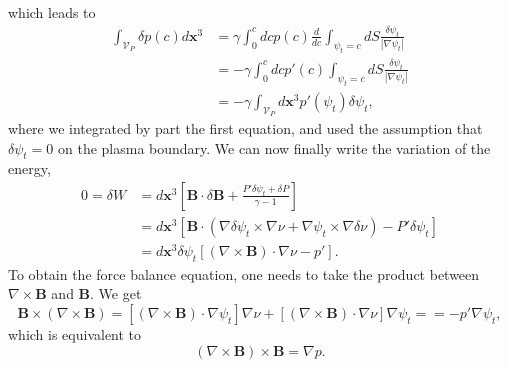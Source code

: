 \documentclass[my_thesis.tex]{subfiles}
\begin{document}
which leads to
\begin{align}
	\int_{\mathcal{V}_P}\delta p(c)d\mathbf{x}^3 &= \gamma\int_0^c dc p(c) \frac{d}{dc}\int_{\psi_t=c}dS\frac{\delta\psi_t}{|\nabla\psi_t|}\\
	&= -\gamma\int_0^c dc p'(c) \int_{\psi_t=c}dS\frac{\delta\psi_t}{|\nabla\psi_t|}\\
	&= -\gamma\int_{\mathcal{V}_P} d\mathbf{x}^3 p'(\psi_t)\delta\psi_t,
\end{align}
where we integrated by part the first equation, and used the assumption that $\delta\psi_t=0$ on the plasma boundary. We can now finally write the variation of the energy,
\begin{align}
	0 = \delta W &= d\mathbf{x}^3 \left[\mathbf{B}\cdot\delta\mathbf{B} + \frac{P'\delta\psi_t + \delta P}{\gamma-1}\right]\\
	&= d\mathbf{x}^3 \left[\mathbf{B}\cdot (\nabla\delta\psi_t\times\nabla\nu + \nabla\psi_t\times\nabla\delta\nu) -P'\delta\psi_t\right]\\
	&= d\mathbf{x}^3 \delta\psi_t\left[(\nabla\times\mathbf{B})\cdot\nabla\nu -p'\right].
\end{align}
To obtain the force balance equation, one needs to take the product between $\nabla\times\mathbf{B}$ and $\mathbf{B}$. We get
\begin{equation}
	\mathbf{B}\times(\nabla\times\mathbf{B}) = [(\nabla\times\mathbf{B})\cdot\nabla\psi_t]\nabla\nu + [(\nabla\times\mathbf{B})\cdot\nabla\nu]\nabla\psi_t = = -p'\nabla\psi_t,
\end{equation}
which is equivalent to
\begin{equation}
	(\nabla\times\mathbf{B})\times\mathbf{B} = \nabla p.
\end{equation}
\end{document}

